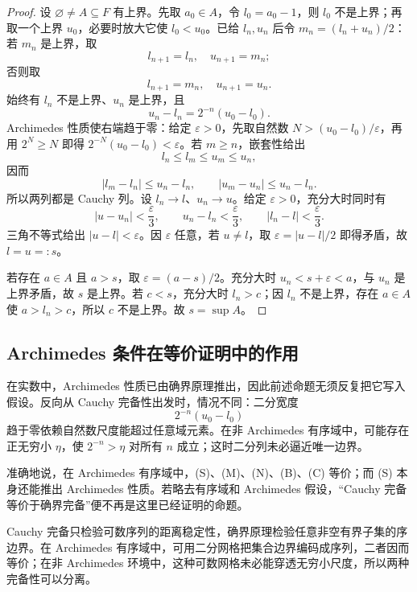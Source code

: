 \begin{proof}
设 \(\varnothing\ne A\subseteq F\) 有上界。先取 \(a_0\in A\)，令 \(l_0=a_0-1\)，则 \(l_0\) 不是上界；再取一个上界 \(u_0\)，必要时放大它使 \(l_0<u_0\)。已给 \(l_n,u_n\) 后令 \(m_n=(l_n+u_n)/2\)：若 \(m_n\) 是上界，取
\[
 l_{n+1}=l_n,\quad u_{n+1}=m_n;
\]
否则取
\[
 l_{n+1}=m_n,\quad u_{n+1}=u_n.
\]
始终有 \(l_n\) 不是上界、\(u_n\) 是上界，且
\[
 u_n-l_n=2^{-n}(u_0-l_0).
\]
Archimedes 性质使右端趋于零：给定 \(\varepsilon>0\)，先取自然数 \(N>(u_0-l_0)/\varepsilon\)，再用 \(2^N\ge N\) 即得 \(2^{-N}(u_0-l_0)<\varepsilon\)。若 \(m\ge n\)，嵌套性给出
\[
  l_n\le l_m\le u_m\le u_n,
\]
因而
\[
 |l_m-l_n|\le u_n-l_n,\qquad
 |u_m-u_n|\le u_n-l_n.
\]
所以两列都是 Cauchy 列。设 \(l_n\to l\)、\(u_n\to u\)。给定 \(\varepsilon>0\)，充分大时同时有
\[
 |u-u_n|<\frac{\varepsilon}{3},\qquad
 u_n-l_n<\frac{\varepsilon}{3},\qquad
 |l_n-l|<\frac{\varepsilon}{3}.
\]
三角不等式给出 \(|u-l|<\varepsilon\)。因 \(\varepsilon\) 任意，若 \(u\ne l\)，取 \(\varepsilon=|u-l|/2\) 即得矛盾，故 \(l=u=:s\)。

若存在 \(a\in A\) 且 \(a>s\)，取 \(\varepsilon=(a-s)/2\)。充分大时 \(u_n<s+\varepsilon<a\)，与 \(u_n\) 是上界矛盾，故 \(s\) 是上界。若 \(c<s\)，充分大时 \(l_n>c\)；因 \(l_n\) 不是上界，存在 \(a\in A\) 使 \(a>l_n>c\)，所以 \(c\) 不是上界。故 \(s=\sup A\)。
\end{proof}

\subsection{Archimedes 条件在等价证明中的作用}


在实数中，Archimedes 性质已由确界原理推出，因此前述命题无须反复把它写入假设。反向从 Cauchy 完备性出发时，情况不同：二分宽度
\[
 2^{-n}(u_0-l_0)
\]
趋于零依赖自然数尺度能超过任意域元素。在非 Archimedes 有序域中，可能存在正无穷小 \(\eta\)，使 \(2^{-n}>\eta\) 对所有 \(n\) 成立；这时二分列未必逼近唯一边界。

准确地说，在 Archimedes 有序域中，(S)、(M)、(N)、(B)、(C) 等价；而 (S) 本身还能推出 Archimedes 性质。若略去有序域和 Archimedes 假设，“Cauchy 完备等价于确界完备”便不再是这里已经证明的命题。

\begin{remark}[序列完备与序完备]
Cauchy 完备只检验可数序列的距离稳定性，确界原理检验任意非空有界子集的序边界。在 Archimedes 有序域中，可用二分网格把集合边界编码成序列，二者因而等价；在非 Archimedes 环境中，这种可数网格未必能穿透无穷小尺度，所以两种完备性可以分离。
\end{remark}

